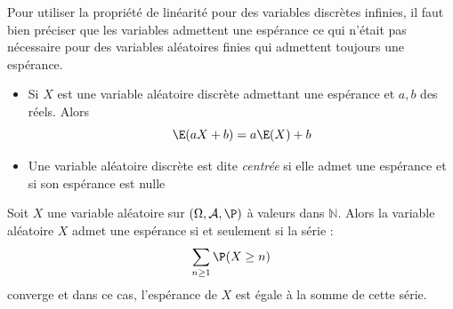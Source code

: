 \documentclass[french,11pt,twoside]{VcCours}
\begin{document}
\begin{Remarque}[\alerte]{} Pour utiliser la propriété de linéarité pour des variables discrètes infinies, il faut bien préciser que les variables admettent une espérance ce qui n'était pas nécessaire pour des variables aléatoires finies qui admettent toujours une espérance.
\end{Remarque} 


\begin{Remarques}{}
\begin{itemize}
\item Si $X$ est une variable aléatoire discrète admettant une espérance et $a,b$ des réels. Alors 
$$ \E (aX + b) =a \E(X)+ b $$
\item Une variable aléatoire discrète est dite \emph{centrée} si elle admet une espérance et si son espérance est nulle
\end{itemize}
\end{Remarques}


%
%

\begin{Proposition}{} Soit $X$ une variable aléatoire sur $(\Omega, \mathcal{A}, \P)$ à valeurs dans $\mathbb{N}$. Alors la variable aléatoire $X$ admet une espérance si et seulement si la série :
$$ \sum_{n \geq 1} \P(X \geq n)$$
converge et dans ce cas, l'espérance de $X$ est égale à la somme de cette série.
\end{Proposition}

\begin{Demonstration}{}

\newpage
  
\vspace*{6cm}
\end{Demonstration}
\end{document}
